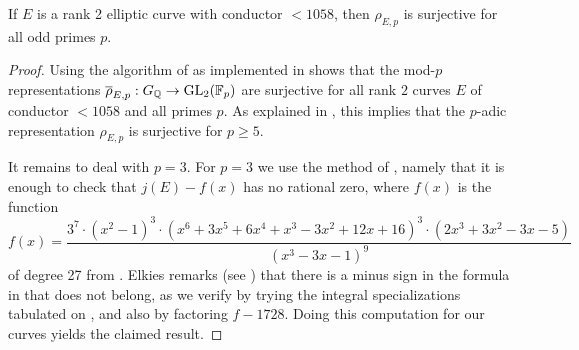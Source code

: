 \documentclass{article} \usepackage[active]{srcltx}
\begin{document}
\begin{proposition}\label{prop:surj}
If $E$ is a rank 2 elliptic curve with conductor
  $<1058$, then $\rho_{E,p}$ is surjective for all odd primes $p$.
\end{proposition}
\begin{proof} 
Using the algorithm of \cite[\S2.1]{bsdalg1} as implemented
in \cite{sage} shows that the mod-$p$ representations $\overline{\rho}_{E,p}:G_{\mathbb{Q}}\to
  \operatorname{GL}_2(\mathbb{F}_p)$ are surjective for all rank $2$ curves $E$ of conductor
  $<1058$ and all primes $p$.
As explained in \cite[\S2.1]{bsdalg1}, this implies that the
$p$-adic representation $\rho_{E,p}$ is surjective for $p\geq 5$.  

It
remains to deal with $p=3$.  For $p=3$ we use the method of \cite{elkies:3},
namely that it is enough to check that $j(E)-f(x)$ has no rational
zero, where $f(x)$ is the function
$$
f(x) = \frac{3^7 \cdot (x^2-1)^3 \cdot
(x^6+3x^5+6x^4+x^3-3x^2+12x+16)^3 \cdot
(2x^3+3x^2-3x-5)}{(x^3-3x-1)^9}
$$
of degree 27 from \cite[pg.~5]{elkies:3}. Elkies remarks (see \cite{elkies:2010-3})
that there is a minus sign in the formula in \cite[pg.~5]{elkies:3}
that does not belong, as we verify by trying the integral
specializations tabulated on \cite[pg.~7]{elkies:3}, and also by
factoring $f-1728$.  Doing this computation for our curves
yields the claimed result.

\end{proof}
\end{document}
